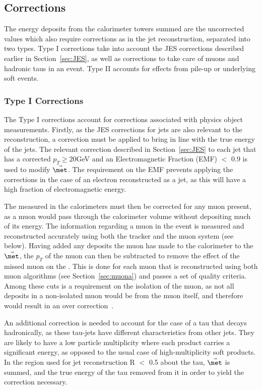 \subsection{\met Corrections}

The energy deposits from the calorimeter towers summed are the uncorrected values which also require corrections as in the jet reconstruction, separated into two types. Type I corrections take into account the JES  corrections described earlier in Section~\ref{sec:JES}, as well as corrections to take care of muons and hadronic taus in an event. Type II  accounts for effects from pile-up or underlying soft events.
 
\subsubsection{Type I Corrections}
The Type I corrections account for corrections associated with physics object measurements. Firstly, as the JES corrections for jets are also relevant to the \met reconstruction, a correction must be applied to bring \met in line with the true energy of the jets. The relevant correction described in Section~\ref{sec:JES} to each jet that has a corrected $p_{T} \geq 20 $GeV and an Electromagnetic Fraction (EMF) $<$ 0.9 is used to modify $\vec{\met}$. The requirement on the EMF prevents applying the corrections in the case of an electron reconstructed as a jet, as this will have a high fraction of electromagnetic  energy.

The \met measured in the calorimeters must then be corrected for any muon present, as a muon would pass through the calorimeter volume without depositing much of its energy. The information regarding a muon in the event is measured and reconstructed accurately using both the tracker and the muon system (see below). Having added any deposits the muon has made to the calorimeter to the $\vec{\met}$, the $p_{T}$ of the muon can then be subtracted to remove the effect of the missed muon on the \met. This is done for each muon that is reconstructed using both muon algorithms (see Section~\ref{sec:muona}) and passes a set of quality criteria. Among these cuts is a requirement on the isolation of the muon, as not all deposits in a non-isolated muon would be from the muon itself, and therefore would result in an over correction~\cite{etmissnote}. 

An additional correction is needed to account for the case of a tau that decays hadronically, as these tau-jets have different characteristics from other jets. They are likely to have a low particle multiplicity where each product carries a significant energy, as opposed to the usual case of high-multiplicity soft products. In the region used for jet reconstruction R $<$ 0.5 about the tau, $\vec{\met}$ is summed, and the true energy of the tau removed from it in order to yield the correction necessary.  


